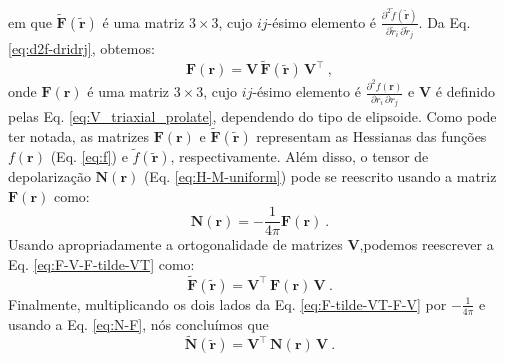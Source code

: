 em que $\tilde{\mathbf{F}}(\tilde{\mathbf{r}})$ é uma matriz $3 \times 3$, cujo $ij$-ésimo elemento é 
$\frac{\partial^{2} \tilde{f}(\tilde{\mathbf{r}})}
{\partial \tilde{r}_{i} \, \partial \tilde{r}_{j}}$.
Da Eq. \ref{eq:d2f-dridrj}, obtemos:
\begin{equation}
\mathbf{F}(\mathbf{r}) = \mathbf{V} \, 
\tilde{\mathbf{F}}(\tilde{\mathbf{r}}) \, \mathbf{V}^{\top} \: ,
\label{eq:F-V-F-tilde-VT}
\end{equation}
onde $\mathbf{F}(\mathbf{r})$ é uma matriz $3 \times 3$, cujo $ij$-ésimo elemento é 
$\frac{\partial^{2} f(\mathbf{r})}
{\partial r_{i} \, \partial r_{j}}$ e
$\mathbf{V}$ é definido pelas Eq. 
\ref{eq:V_triaxial_prolate}, dependendo do tipo de
elipsoide. Como pode ter notada, as matrizes $\mathbf{F}(\mathbf{r})$ e
$\tilde{\mathbf{F}}(\tilde{\mathbf{r}})$ representam as Hessianas
das funções $f(\mathbf{r})$ (Eq. \ref{eq:f})
e $\tilde{f}(\tilde{\mathbf{r}})$, respectivamente.
Além disso, o tensor de depolarização $\mathbf{N}(\mathbf{r})$
(Eq. \ref{eq:H-M-uniform}) pode se 
reescrito usando a matriz $\mathbf{F}(\mathbf{r})$
como:
\begin{equation}
\mathbf{N}(\mathbf{r}) = - \frac{1}{4 \pi} \mathbf{F}(\mathbf{r}) \: .
\label{eq:N-F}
\end{equation}
Usando apropriadamente a ortogonalidade de matrizes
$\mathbf{V}$,podemos reescrever a Eq. \ref{eq:F-V-F-tilde-VT}
como:
\begin{equation}
\tilde{\mathbf{F}}(\tilde{\mathbf{r}}) = \mathbf{V}^{\top} \, 
\mathbf{F}(\mathbf{r}) \, \mathbf{V} \: .
\label{eq:F-tilde-VT-F-V}
\end{equation}
Finalmente, multiplicando os dois lados da Eq. \ref{eq:F-tilde-VT-F-V}
por $-\frac{1}{4 \pi}$ e usando a Eq. \ref{eq:N-F},
nós concluímos que 
\begin{equation}
\tilde{\mathbf{N}}(\tilde{\mathbf{r}}) = 
\mathbf{V}^{\top} \, \mathbf{N}(\mathbf{r}) \, \mathbf{V} \: .
\label{eq:N-tilde-VT-N-V}
\end{equation}
